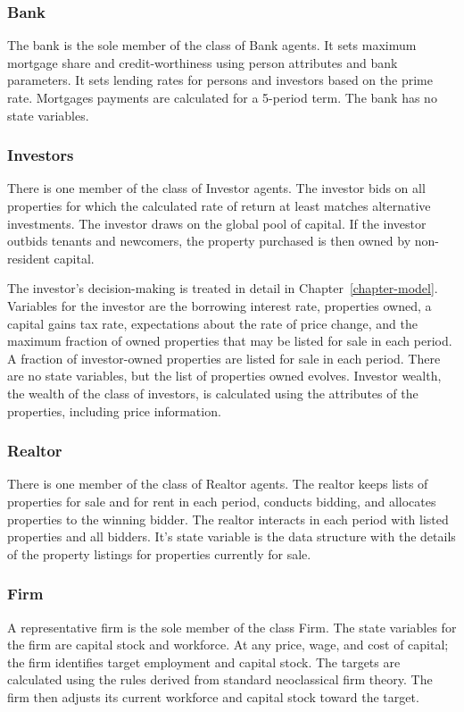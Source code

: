 \subsubsection{Bank}
The bank is the sole member of the class of Bank agents. It sets maximum mortgage share and credit-worthiness using person attributes and bank parameters. It sets lending rates for persons and investors based on the prime rate. Mortgages payments are calculated for a 5-period term. The bank has no state variables.
 
\subsubsection{Investors}
There is one member of the class of Investor agents. 
The investor bids on all properties for which the calculated rate of return at least matches alternative investments. The investor draws on the global pool of capital. If the investor outbids tenants and newcomers, the property purchased is then owned by non-resident capital.  

The investor's decision-making is treated in detail in Chapter~\ref{chapter-model}. Variables for the investor are the borrowing interest rate, properties owned, a capital gains tax rate, expectations about the rate of price change, and the maximum fraction of owned properties that may be listed for sale in each period. A fraction of investor-owned properties are listed for sale in each period. There are no  state variables, but the list of properties owned evolves. Investor wealth, the wealth of the class of investors, is calculated using the attributes of the properties, including price information.


\subsubsection{Realtor}
There is one member of the class of Realtor agents. 
The realtor keeps lists of properties for sale and for rent in each period, conducts bidding, and allocates properties to the winning bidder. The realtor interacts in each period with listed properties and all bidders. It's state variable is the data structure with the details of the property listings for properties currently for sale.

\subsubsection{Firm}
A representative firm is the sole member of the class Firm. The state variables for the firm are capital stock and workforce. At any price, wage, and cost of capital; the firm identifies target employment and capital stock. The targets are calculated using the rules derived from standard neoclassical firm theory. The firm then adjusts its current workforce and capital stock toward the target. 

